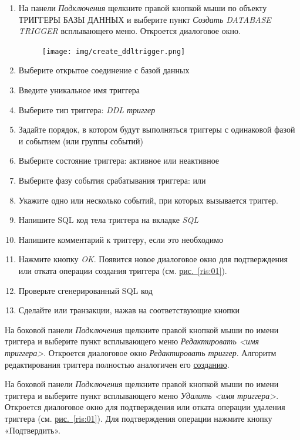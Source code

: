 \begin{enumerate}[leftmargin=26pt]
	\item  На панели \textit{Подключения} щелкните правой кнопкой мыши по объекту ТРИГГЕРЫ БАЗЫ ДАННЫХ и выберите пункт \textit{Создать DATABASE TRIGGER} всплывающего меню. Откроется диалоговое окно.
	\begin{figure}[H]
		\centering
		\texttt{[image: img/create\_ddltrigger.png]}
	\end{figure}
	\item Выберите открытое соединение с базой данных
	\item Введите уникальное имя триггера
	\item Выберите тип триггера: \textit{DDL триггер}
	\item Задайте порядок, в котором будут выполняться триггеры с одинаковой фазой и событием (или группы событий)
	\item Выберите состояние триггера: активное или неактивное 
	\item Выберите фазу события срабатывания триггера:  или 
	\item Укажите одно или несколько событий, при которых вызывается триггер.  
	\item Напишите SQL код тела триггера на вкладке \textit{SQL} 
	\item Напишите комментарий к триггеру, если это необходимо
	\item Нажмите кнопку \textit{OK}. Появится новое диалоговое окно для подтверждения или отката операции создания триггера (см. \hyperref[ris:01]{рис.~\ref{ris:01}}).
	\item Проверьте сгенерированный SQL код 
	\item Сделайте  или  транзакции, нажав на соответствующие кнопки
\end{enumerate}	

На боковой панели \textit{Подключения} щелкните правой кнопкой мыши по имени триггера и выберите пункт всплывающего меню \textit{Редактировать <имя триггера>}. Откроется диалоговое окно \textit{Редактировать триггер}. Алгоритм редактирования триггера полностью аналогичен его \hyperref[sec:crtrig]{созданию}.

На боковой панели \textit{Подключения} щелкните правой кнопкой мыши по имени триггера и выберите пункт всплывающего меню \textit{Удалить <имя триггера>}. Откроется  диалоговое окно для подтверждения или отката операции удаления триггера (см. \hyperref[ris:01]{рис.~\ref{ris:01}}). Для подтверждения операции нажмите кнопку «Подтвердить».

